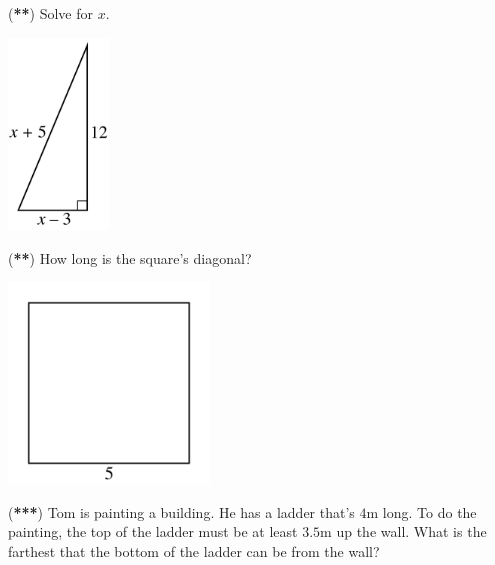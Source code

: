 \documentclass[addpoints,12pt]{exam}
\begin{document}
\begin{questions}
\vspace{0.2in}


\newpage


\question
(\textbf{**})
Solve for $x$.

\includegraphics[width=0.2\textwidth]{../images/d6.png}

\vspace{0.3in}


\question
(\textbf{**})
How long is the square's diagonal?

\includegraphics[width=0.4\textwidth]{../images/d8.png}

\vspace{0.3in}


\question
(\textbf{***})
Tom is painting a building. He has a ladder that's $4\si{\m}$ long. To do the painting, the top of the ladder must be at least $3.5 \si{\m}$ up the wall. What is the farthest that the bottom of the ladder can be from the wall?
\vspace{0.3in}


\vfill %


\begin{Answer}
\end{Answer}



\end{questions}
\end{document}
